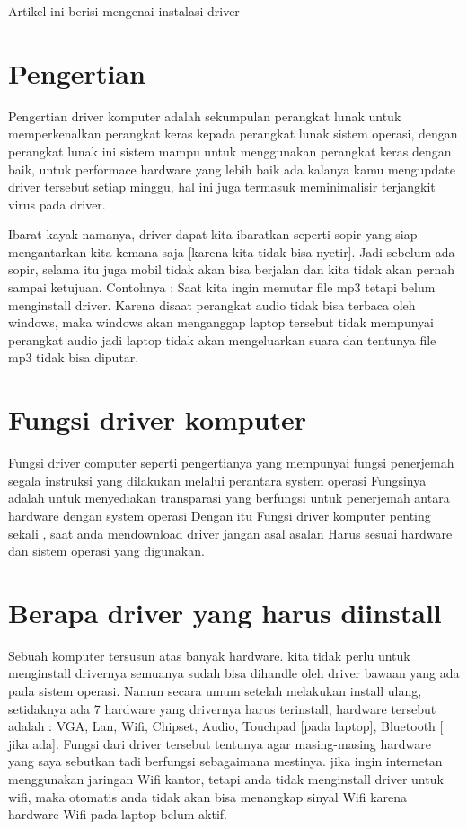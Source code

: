 ﻿%


%

Artikel ini berisi mengenai instalasi driver
\section{Pengertian}
Pengertian driver komputer adalah sekumpulan perangkat lunak untuk memperkenalkan perangkat keras kepada perangkat lunak sistem operasi, dengan perangkat lunak ini sistem mampu untuk menggunakan perangkat keras dengan baik, untuk performace hardware yang lebih baik ada kalanya kamu mengupdate driver tersebut setiap minggu, hal ini juga termasuk meminimalisir terjangkit virus pada driver.

Ibarat kayak  namanya, driver dapat kita ibaratkan seperti sopir yang siap mengantarkan kita kemana saja [karena kita tidak bisa nyetir].
Jadi sebelum ada sopir, selama itu juga mobil tidak akan bisa berjalan dan kita tidak akan pernah sampai ketujuan.
Contohnya  : Saat kita ingin memutar file mp3 tetapi belum menginstall driver.
Karena disaat perangkat audio tidak bisa terbaca oleh windows, maka windows akan menganggap laptop tersebut tidak mempunyai perangkat audio jadi laptop tidak akan mengeluarkan suara dan tentunya file mp3 tidak bisa diputar.

\section{Fungsi driver komputer}
Fungsi driver computer seperti pengertianya yang mempunyai fungsi penerjemah segala instruksi yang dilakukan melalui perantara system operasi
Fungsinya adalah untuk menyediakan transparasi yang berfungsi untuk penerjemah antara hardware dengan system operasi 
Dengan itu Fungsi driver komputer penting sekali , saat anda mendownload driver jangan asal asalan
Harus sesuai hardware dan sistem operasi yang digunakan.

\section{Berapa driver yang harus diinstall}

Sebuah komputer tersusun atas banyak hardware.  kita tidak perlu untuk menginstall drivernya  semuanya
sudah bisa dihandle oleh driver bawaan yang ada pada sistem operasi.
Namun secara umum setelah melakukan install ulang, setidaknya ada 7 hardware yang drivernya harus terinstall, hardware tersebut adalah : VGA, Lan, Wifi, Chipset, Audio, Touchpad [pada laptop], Bluetooth [ jika ada].
Fungsi dari driver tersebut tentunya agar masing-masing hardware yang saya sebutkan tadi berfungsi sebagaimana mestinya.
jika ingin internetan menggunakan jaringan Wifi kantor, tetapi anda tidak menginstall driver untuk wifi, maka otomatis anda tidak akan bisa menangkap sinyal Wifi karena hardware Wifi pada laptop belum aktif.

